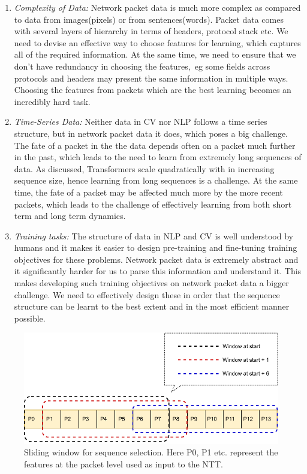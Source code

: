 \begin{enumerate}
\item \emph{Complexity of Data:} Network packet data is much more complex as compared to data from images(pixels) or from sentences(words). Packet data comes with several layers of hierarchy in terms of headers, protocol stack etc. We need to devise an effective way to choose features for learning, which captures all of the required information. At the same time, we need to ensure that we don't have redundancy in choosing the features,\ eg some fields across protocols and headers may present the same information in multiple ways. Choosing the features from packets which are the best learning becomes an incredibly hard task.

\item \emph{Time-Series Data:} Neither data in CV nor NLP follows a time series structure, but in network packet data it does, which poses a big challenge. The fate of a packet in the the data depends often on a packet much further in the past, which leads to the need to learn from extremely long sequences of data. As discussed, Transformers scale quadratically with in increasing sequence size, hence learning from long sequences is a challenge. At the same time, the fate of a packet may be affected much more by the more recent packets, which leads to the challenge of effectively learning from both short term and long term dynamics.

\item \emph{Training tasks:} The structure of data in NLP and CV is well understood by humans and it makes it easier to design pre-training and fine-tuning training objectives for these problems. Network packet data is extremely abstract and it significantly harder for us to parse this information and understand it. This makes developing such training objectives on network packet data a bigger challenge. We need to effectively design these in order that the sequence structure can be learnt to the best extent and in the most efficient manner possible.

\end{enumerate}

\begin{figure}[h]
  \begin{center}
    \includegraphics[scale=1]{figures/slidingwindow.pdf}
    \caption{Sliding window for sequence selection. Here P0, P1 etc. represent the features at the packet level used as input to the NTT.}
    \label{fig:sliding}
  \end{center}
\end{figure}


